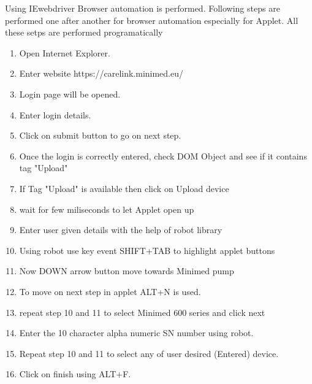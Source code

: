 \documentclass[article,type=msc,colorback,accentcolor=tud9c,twoside,11pt]{tudthesis}
\begin{document}
Using IEwebdriver Browser automation is performed. Following steps are performed one after another  for browser automation especially for Applet. All these setps are performed programatically
\begin{enumerate}
\item Open Internet Explorer.
\item Enter website https://carelink.minimed.eu/
\item Login page will be opened.
\item Enter login details.
\item Click on submit button to go on next step.
\item Once the login is correctly entered, check DOM Object and see if it contains tag "Upload"
\item  If Tag "Upload" is available then click on Upload device
\item  wait for few miliseconds to let Applet open up
\item Enter user given details with the help of robot library
\item Using robot use key event SHIFT+TAB to highlight applet buttons
\item Now DOWN arrow button move towards Minimed pump
\item To move on next step in applet ALT+N is used.
\item repeat step 10 and 11 to select Minimed 600 series and click next
\item Enter the 10 character alpha numeric SN number using robot.
\item Repeat step 10 and 11 to select any of user desired (Entered) device.
\item Click on finish using ALT+F.
\end{enumerate}
\end{document}
